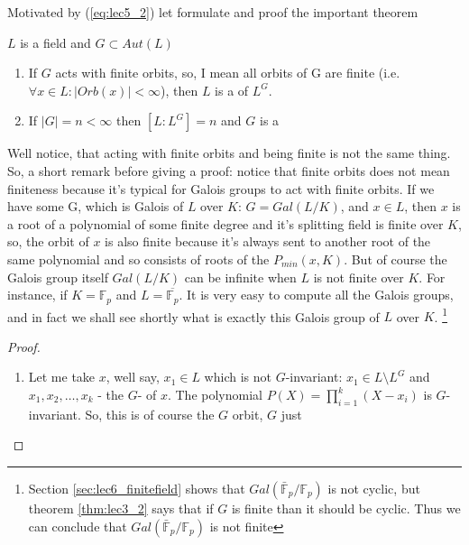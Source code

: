 Motivated by (\ref{eq:lec5_2}) let formulate and proof the important
theorem
\begin{theorem}[Artin]
  $L$ is a field and $G \subset Aut\left(L\right)$
  \begin{enumerate}
  \item If $G$ acts with finite orbits,  so, I mean all orbits of G
    are finite (i.e. $\forall x \in L: \left|Orb(x)\right| < \infty$),
    then $L$ is a  of $L^G$. 
  \item If $\left|G\right| = n < \infty$ then
    $\left[L : L^G\right] = n$ and $G$ is a 
  \end{enumerate}

  \begin{remark}
    Well notice, that acting with finite orbits  and being finite is not
    the same thing. So, a short remark before giving a proof: notice
    that finite orbits does not mean finiteness because it's typical for
    Galois groups to act with finite orbits.  If we have some G, which
    is Galois of $L$ over $K$: $G = Gal\left(L/K\right)$, and
    $x \in L$, then $x$ is a root of a 
    polynomial of some finite degree  and it's splitting field is
    finite over $K$, so, the orbit of $x$ is also finite 
    because it's always sent to another root of the
    same polynomial and so consists of roots of  the
    $P_{min}\left(x, K\right)$. But of course the Galois group itself
    $Gal\left(L/K\right)$ can be infinite when $L$ is not finite over $K$. For
    instance, if  $K  = \mathbb{F}_p$ and $L = \overline{\mathbb{F}_p}$. It is
    very easy to compute all the Galois groups, and in fact we shall see
    shortly what is exactly this Galois group of $L$ over $K$.
    \footnote{
      Section \ref{sec:lec6_finitefield} shows that
      $Gal\left(\bar{\mathbb{F}}_p/\mathbb{F}_p\right)$ is not cyclic,
      but theorem \ref{thm:lec3_2} says that if $G$ is finite than it
      should be cyclic. Thus we can conclude that
      $Gal\left(\bar{\mathbb{F}}_p/\mathbb{F}_p\right)$ is not finite
    }
  \end{remark}
  \begin{proof}
    \begin{enumerate}
    \item  Let me take $x$, well say, $x_1 \in L$ which is not
      $G$-invariant: $x_1 \in L \setminus L^G$ and
      $x_1, x_2, \dots, x_k$ - the $G$- of $x$. The
      polynomial $P\left(X\right) = \prod_{i=1}^k\left(X - x_i\right)$
      is $G$-invariant. So, this is of course the $G$ orbit, $G$ just

\end{enumerate}
\end{proof}
\end{theorem}
